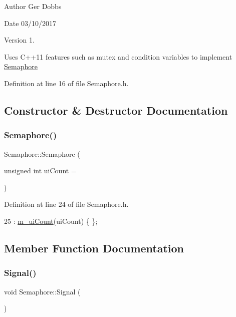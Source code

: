 \begin{DoxyAuthor}{Author}
Ger Dobbs 
\end{DoxyAuthor}
\begin{DoxyDate}{Date}
03/10/2017 
\end{DoxyDate}
\begin{DoxyVersion}{Version}
1.
\end{DoxyVersion}
Uses C++11 features such as mutex and condition variables to implement \hyperlink{classSemaphore}{Semaphore} 

Definition at line 16 of file Semaphore.\+h.



\subsection{Constructor \& Destructor Documentation}
\mbox{\label{classSemaphore_a0d9290d316636875ca85d1d78950a817}} 
\subsubsection{\texorpdfstring{Semaphore()}{Semaphore()}}
{\footnotesize\ttfamily Semaphore\+::\+Semaphore (\begin{DoxyParamCaption}\item[{unsigned int}]{ui\+Count = {} }\end{DoxyParamCaption})\hspace{0.3cm}{\ttfamily [inline]}}



Definition at line 24 of file Semaphore.\+h.


\begin{DoxyCode}
25           : \hyperlink{classSemaphore_a1456f105008b0c309f41211afbdd5fee}{m\_uiCount}(uiCount) \{ \};
\end{DoxyCode}


\subsection{Member Function Documentation}
\mbox{\label{classSemaphore_a86f92f738b4486439b296d8e235895f2}} 
\subsubsection{\texorpdfstring{Signal()}{Signal()}}
{\footnotesize\ttfamily void Semaphore\+::\+Signal (\begin{DoxyParamCaption}{ }\end{DoxyParamCaption})}



